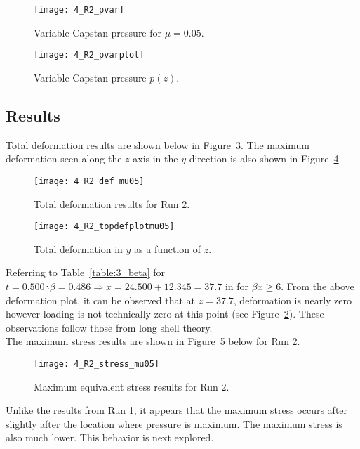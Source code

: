 \begin{figure}[H]
	\centering
	\texttt{[image: 4\_R2\_pvar]}
	\caption{Variable Capstan pressure for $\mu=0.05$.}
	\label{fig:4_R2_pvar}
\end{figure}
\begin{figure}[H]
	\centering
	\texttt{[image: 4\_R2\_pvarplot]}
	\caption{Variable Capstan pressure $p(z)$.}
	\label{fig:4_R2_pvarplot}
\end{figure}

\subsection{Results}

Total deformation results are shown below in Figure~\ref{fig:4_R2_def_mu05}. The maximum deformation seen along the $z$ axis in the $y$ direction is also shown in Figure~\ref{fig:4_R2_topdefplotmu05}.

\begin{figure}[H]
	\centering
 	\texttt{[image: 4\_R2\_def\_mu05]}
 	\caption{Total deformation results for Run 2.}
 	\label{fig:4_R2_def_mu05}
 \end{figure}
 
 \begin{figure}[H]
 	\centering
 \texttt{[image: 4\_R2\_topdefplotmu05]}
 	\caption{Total deformation in $y$ as a function of $z$.}
 	\label{fig:4_R2_topdefplotmu05}
 \end{figure}
 
Referring to Table~\ref{table:3_beta} for $t=0.500 \therefore \beta = 0.486 \Rightarrow x= 24.500+12.345 = 37.7$ in for $\beta x \geq 6$. From the above deformation plot, it can be observed that at $z=37.7$, deformation is nearly zero however loading is not technically zero at this point (see Figure~\ref{fig:4_R2_pvarplot}). These observations follow those from long shell theory.\\

The maximum stress results are shown in Figure~\ref{fig:4_R2_stress_mu05} below for Run 2.

\begin{figure}[H]
	\centering
	\texttt{[image: 4\_R2\_stress\_mu05]}
	\caption{Maximum equivalent stress results for Run 2.}
	\label{fig:4_R2_stress_mu05}
\end{figure}

Unlike the results from Run 1, it appears that the maximum stress occurs after slightly after the location where pressure is maximum. The maximum stress is also much lower. This behavior is next explored.


